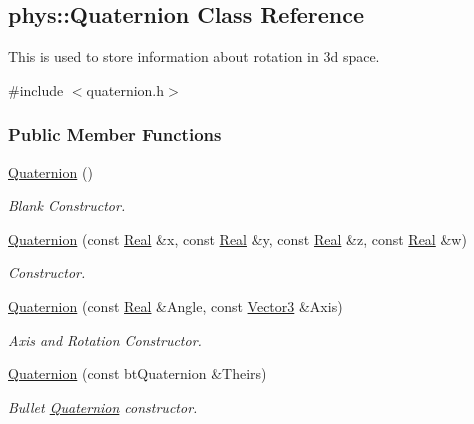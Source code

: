 \hypertarget{classphys_1_1Quaternion}{
\subsection{phys::Quaternion Class Reference}
\label{classphys_1_1Quaternion}
}


This is used to store information about rotation in 3d space.  




{\ttfamily \#include $<$quaternion.h$>$}

\subsubsection*{Public Member Functions}
\begin{DoxyCompactItemize}
\item 
\hyperlink{classphys_1_1Quaternion_aca4ee6fd6d3967f06cc4a32361fa5a62}{Quaternion} ()
\begin{DoxyCompactList}\small\item\em Blank Constructor. \item\end{DoxyCompactList}\item 
\hyperlink{classphys_1_1Quaternion_ac8037875c08ce10c0195f3e6fd08b172}{Quaternion} (const \hyperlink{namespacephys_af7eb897198d265b8e868f45240230d5f}{Real} \&x, const \hyperlink{namespacephys_af7eb897198d265b8e868f45240230d5f}{Real} \&y, const \hyperlink{namespacephys_af7eb897198d265b8e868f45240230d5f}{Real} \&z, const \hyperlink{namespacephys_af7eb897198d265b8e868f45240230d5f}{Real} \&w)
\begin{DoxyCompactList}\small\item\em Constructor. \item\end{DoxyCompactList}\item 
\hyperlink{classphys_1_1Quaternion_a9246247b7b28f19839148415a7ddeb96}{Quaternion} (const \hyperlink{namespacephys_af7eb897198d265b8e868f45240230d5f}{Real} \&Angle, const \hyperlink{classphys_1_1Vector3}{Vector3} \&Axis)
\begin{DoxyCompactList}\small\item\em Axis and Rotation Constructor. \item\end{DoxyCompactList}\item 
\hyperlink{classphys_1_1Quaternion_ab9f13d19fe7d602d7c5feaed0aaf4620}{Quaternion} (const btQuaternion \&Theirs)
\begin{DoxyCompactList}\small\item\em Bullet \hyperlink{classphys_1_1Quaternion}{Quaternion} constructor. \item\end{DoxyCompactList}\item 

\end{DoxyCompactItemize}
